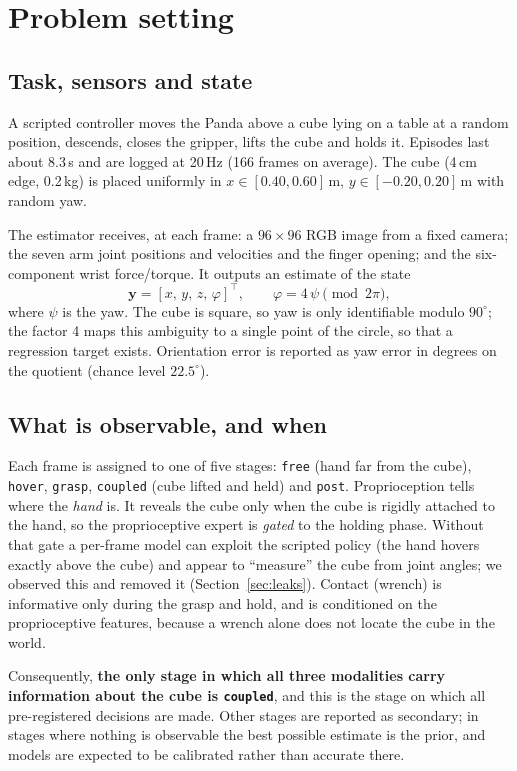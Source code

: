 \documentclass[11pt,a4paper]{article}
\newcommand{\vect}[1]{\bm{#1}}
\begin{document}
\section{Problem setting}
\subsection{Task, sensors and state}
A scripted controller moves the Panda above a cube lying on a table at a random position, descends, closes the gripper, lifts the cube and holds it. Episodes last about 8.3\,s and are logged at 20\,Hz (166 frames on average). The cube (4\,cm edge, 0.2\,kg) is placed uniformly in $x\in[0.40,0.60]$\,m, $y\in[-0.20,0.20]$\,m with random yaw.

The estimator receives, at each frame: a $96{\times}96$ RGB image from a fixed camera; the seven arm joint positions and velocities and the finger opening; and the six-component wrist force/torque. It outputs an estimate of the state
\begin{equation}
\vect y = [x,\,y,\,z,\,\varphi]^\top,\qquad \varphi = 4\,\psi \pmod{2\pi},
\end{equation}
where $\psi$ is the yaw. The cube is square, so yaw is only identifiable modulo $90^\circ$; the factor 4 maps this ambiguity to a single point of the circle, so that a regression target exists. Orientation error is reported as yaw error in degrees on the quotient (chance level $22.5^\circ$).

\subsection{What is observable, and when}
\label{sec:stages}
Each frame is assigned to one of five stages: \texttt{free} (hand far from the cube), \texttt{hover}, \texttt{grasp}, \texttt{coupled} (cube lifted and held) and \texttt{post}. Proprioception tells where the \emph{hand} is. It reveals the cube only when the cube is rigidly attached to the hand, so the proprioceptive expert is \emph{gated} to the holding phase. Without that gate a per-frame model can exploit the scripted policy (the hand hovers exactly above the cube) and appear to ``measure'' the cube from joint angles; we observed this and removed it (Section~\ref{sec:leaks}). Contact (wrench) is informative only during the grasp and hold, and is conditioned on the proprioceptive features, because a wrench alone does not locate the cube in the world.

Consequently, \textbf{the only stage in which all three modalities carry information about the cube is \texttt{coupled}}, and this is the stage on which all pre-registered decisions are made. Other stages are reported as secondary; in stages where nothing is observable the best possible estimate is the prior, and models are expected to be calibrated rather than accurate there.
\end{document}
